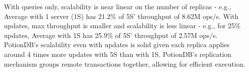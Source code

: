 \documentclass[sigplan,review,anonymous]{acmart}
\begin{document}
With queries only, scalability is near linear on the number of replicas - e.g., Average with 1 server (1S) has 21.2\% of 5S' throughput of 8.62M ops/s.
With updates, max throughput is smaller and scalability is less linear - e.g., for 25\% updates, Average with 1S has 25.9\% of 5S' throughput of 2.57M ops/s.
PotionDB's scalability even with updates is solid given each replica applies around 4 times more updates with 5S than with 1S.
PotionDB's replication mechanism groups remote transactions together, allowing for efficient execution.
\end{document}
